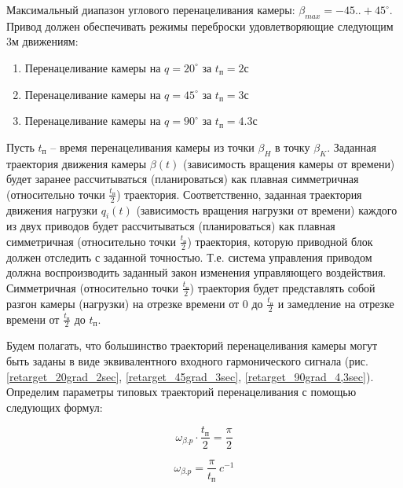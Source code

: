 Максимальный диапазон углового перенацеливания камеры: $\beta_{max} = -45..+45^{\circ}$.
Привод должен обеспечивать режимы переброски удовлетворяющие следующим 3м движениям:

\begin{enumerate}
    \item Перенацеливание камеры на $q = 20^{\circ}$ за $t_{\text{п}} = 2   \text{с}$
    \item Перенацеливание камеры на $q = 45^{\circ}$ за $t_{\text{п}} = 3   \text{с}$
    \item Перенацеливание камеры на $q = 90^{\circ}$ за $t_{\text{п}} = 4.3 \text{с}$
\end{enumerate}

Пусть $t_\text{п}$ – время перенацеливания камеры из точки $\beta_{H}$ в точку $\beta_{K}$.
Заданная траектория движения камеры $\beta(t)$ (зависимость вращения камеры от времени)
будет заранее рассчитываться (планироваться) как плавная симметричная
(относительно точки $\frac{t_\text{п} }{2}$) траектория.
Соответственно, заданная траектория движения нагрузки $q_{i}(t)$
(зависимость вращения нагрузки от времени) каждого из двух приводов будет рассчитываться
(планироваться) как плавная симметричная (относительно точки $\frac{t_\text{п} }{2}$)
траектория, которую приводной блок должен отследить с заданной точностью.
Т.е. система управления приводом должна воспроизводить заданный закон изменения управляющего
воздействия.
Симметричная (относительно точки $\frac{t_\text{п} }{2}$) траектория будет представлять
собой разгон камеры (нагрузки) на отрезке времени от 0 до $\frac{t_\text{п} }{2}$
и замедление на отрезке времени от $\frac{t_\text{п} }{2}$ до $t_\text{п}$.

Будем полагать, что большинство траекторий перенацеливания камеры могут быть заданы
в виде эквивалентного входного гармонического сигнала
(рис. \ref{retarget_20grad_2sec},
      \ref{retarget_45grad_3sec},
      \ref{retarget_90grad_4,3sec}).
Определим параметры типовых траекторий перенацеливания с помощью следующих формул:

\begin{equation}
    \label{retarget_angle}
    \omega_{\beta.p} \cdot \frac{t_\text{п} }{2} = \frac{\pi}{2}
\end{equation}

\begin{equation}
    \label{equiv_signal_frequency}
    \omega_{\beta.p} = \frac{\pi}{t_\text{п} } ~c^{-1}
\end{equation}

